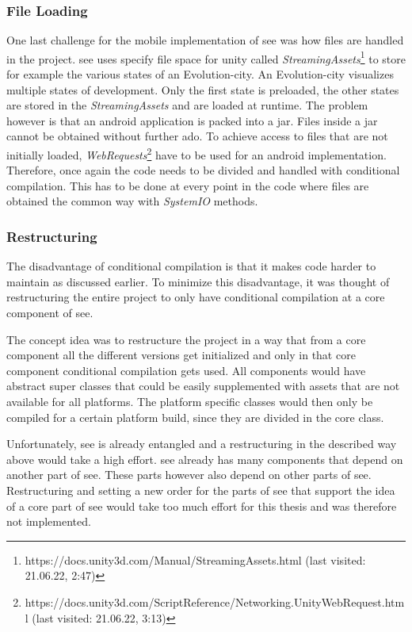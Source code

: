 \subsubsection{File Loading}
One last challenge for the mobile implementation of \gls{see} was how files are handled in the project.
\gls{see} uses specify file space for \gls{unity} called \textit{StreamingAssets}\footnote{https://docs.unity3d.com/Manual/StreamingAssets.html (last visited: 21.06.22, 2:47)} to store for example the various states of an Evolution-\gls{city}.
An Evolution-\gls{city} visualizes multiple states of development.
Only the first state is preloaded, the other states are stored in the \textit{StreamingAssets} and are loaded at runtime. 
The problem however is that an \gls{android} application is packed into a \gls{jar}.
Files inside a \gls{jar} cannot be obtained without further ado.
To achieve access to files that are not initially loaded, \textit{WebRequests}\footnote{https://docs.unity3d.com/ScriptReference/Networking.UnityWebRequest.html (last visited: 21.06.22, 3:13)} have to be used for an \gls{android} implementation. 
Therefore, once again the code needs to be divided and handled with conditional compilation.
This has to be done at every point in the code where files are obtained the common way with \textit{SystemIO} methods. 


\subsubsection{Restructuring}
\label{sec:restructure}
The disadvantage of conditional compilation is that it makes code harder to maintain as discussed earlier.
To minimize this disadvantage, it was thought of restructuring the entire project to only have conditional compilation at a core component of \gls{see}.

The concept idea was to restructure the project in a way that from a core component all the different versions get initialized and only in that core component conditional compilation gets used.
All components would have abstract super classes that could be easily supplemented with assets that are not available for all platforms.
The platform specific classes would then only be compiled for a certain platform build, since they are divided in the core class.

Unfortunately, \gls{see} is already entangled and a restructuring in the described way above would take a high effort.
\gls{see} already has many components that depend on another part of \gls{see}. 
These parts however also depend on other parts of \gls{see}. 
Restructuring and setting a new order for the parts of \gls{see} that support the idea of a core part of \gls{see} would take too much effort for this thesis and was therefore not implemented.